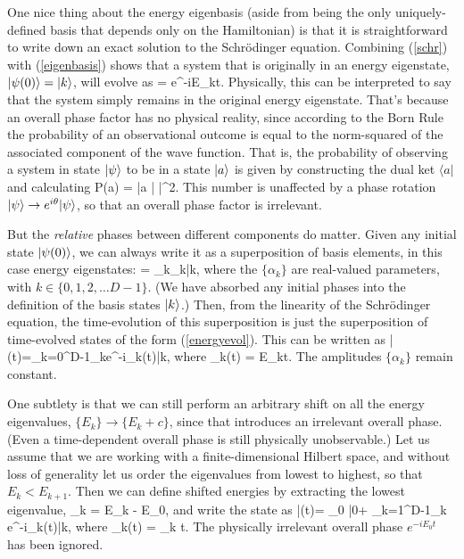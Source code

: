 \documentclass[aps,prd,twocolumn,nofootinbib,notitlepage]{revtex4-1}
\begin{document}
One nice thing about the energy eigenbasis (aside from being the only uniquely-defined basis that depends only on the Hamiltonian) is that it is straightforward to write down an exact solution to the Schr\"odinger equation.
Combining (\ref{schr}) with (\ref{eigenbasis}) shows that a system that is originally in an energy eigenstate, $\lvert \psi(0)\rangle = \lvert k\rangle$, will evolve as
\be
   = e^{-iE_kt}.
  \label{energyevol}
\ee
Physically, this can be interpreted to say that the system simply remains in the original energy eigenstate.
That's because an overall phase factor has no physical reality, since according to the Born Rule the probability of an observational outcome is equal to the norm-squared of the associated component of the wave function.
That is, the probability of observing a system in state $\lvert \psi\rangle$ to be in a state $\lvert a\rangle$ is given by constructing the dual ket $\langle a|$ and calculating
\be
  P(a) = |\langle a | \psi\rangle|^2.
\ee
This number is unaffected by a phase rotation $\lvert \psi\rangle \rightarrow e^{i\theta}\lvert \psi\rangle$, so that an overall phase factor is irrelevant.

But the \emph{relative} phases between different components do matter.
Given any initial state $\lvert \psi(0)\rangle$, we can always write it as a superposition of basis elements, in this case energy eigenstates:
\be
   = \sum_{k}{\alpha_k\left|k\right\rangle},
\ee
where the $\{\alpha_k\}$ are real-valued parameters, with $k\in \{0, 1, 2, \ldots D-1\}$.
(We have absorbed any initial phases into the definition of the basis states $\lvert k\rangle$.)
Then, from the linearity of the Schr\"odinger equation, the time-evolution of this superposition is just the superposition of time-evolved states of the form (\ref{energyevol}).
This can be written as
\be
\left|\psi\left(t\right)\right\rangle=\sum_{k=0}^{D-1}{\alpha_ke^{-i\theta_k(t)}\left|k\right\rangle},
\label{psi-evol}                         
\ee
where
\be
  \theta_k(t) = E_kt.
\ee
The amplitudes $\{\alpha_k\}$ remain constant.

One subtlety is that we can still perform an arbitrary shift on all the energy eigenvalues, $\{E_k\} \rightarrow \{ E_k + c\}$, since that introduces an irrelevant overall phase.
(Even a time-dependent overall phase is still physically unobservable.)
Let us assume that we are working with a finite-dimensional Hilbert space, and without loss of generality let us order the eigenvalues from lowest to highest, so that $E_k < E_{k+1}$.
Then we can define shifted energies by extracting the lowest eigenvalue,
\be
  \E_k = E_k - E_0,
\ee
and write the state as
\be
\left|\psi\left(t\right)\right\rangle= \alpha_0 |0\rangle + \sum_{k=1}^{D-1}{\alpha_k e^{-i\thetat_k(t)}\left|k\right\rangle}, 
  \label{finalstate}                  
\ee
where
\be
  \thetat_k(t) = \E_k t.
\ee
The physically irrelevant overall phase $e^{-iE_0t}$ has been ignored.
\end{document}
